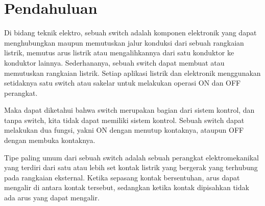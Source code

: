 \section{Pendahuluan}
\label{sec:pendahuluan}


Di bidang teknik elektro, sebuah switch adalah komponen elektronik yang dapat menghubungkan maupun memutuskan jalur konduksi dari sebuah rangkaian listrik, memutus arus listrik atau mengalihkannya dari satu konduktor ke konduktor lainnya. Sederhananya, sebuah switch dapat membuat atau memutuskan rangkaian listrik. Setiap aplikasi listrik dan elektronik menggunakan setidaknya satu switch atau sakelar untuk melakukan operasi ON dan OFF perangkat.

Maka dapat diketahui bahwa switch merupakan bagian dari sistem kontrol, dan tanpa switch, kita tidak dapat memiliki sistem kontrol. Sebuah switch dapat melakukan dua fungsi, yakni ON dengan menutup kontaknya, ataupun OFF dengan membuka kontaknya.

Tipe paling umum dari sebuah switch adalah sebuah perangkat elektromekanikal yang terdiri dari satu atau lebih set kontak listrik yang bergerak yang terhubung pada rangkaian eksternal. Ketika sepasang kontak bersentuhan, arus dapat mengalir di antara kontak tersebut, sedangkan ketika kontak dipisahkan tidak ada arus yang dapat mengalir.
